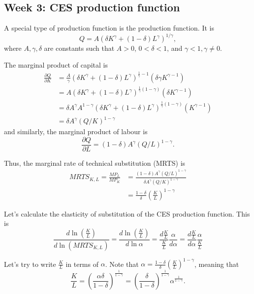 \documentclass[a4paper, 12pt,oneside,openany]{book}
\begin{document}
\subsection{Week 3: CES production function}

A special type of production function is the  production function. It is $$Q = A(\delta K^\gamma + (1-\delta) L^\gamma)^{1/\gamma},$$ where $A, \gamma, \delta$ are constants such that $A>0$, $0<\delta<1$, and $\gamma<1, \gamma \neq 0$.

The marginal product of capital is \begin{align*}\frac{\partial Q}{\partial K} &= \frac{A}{\gamma} (\delta K^\gamma + (1-\delta) L^\gamma)^{\frac{1}{\gamma}-1} (\delta\gamma K^{\gamma-1})\\ &= A(\delta K^\gamma + (1-\delta) L^\gamma)^{\frac{1}{\gamma}(1-\gamma)}(\delta K^{\gamma-1})\\ &= \delta A^\gamma A^{1-\gamma} (\delta K^\gamma+(1-\delta) L^\gamma)^{\frac{1}{\gamma}(1-\gamma)}(K^{\gamma-1})\\ &= \delta A^\gamma (Q/K)^{1-\gamma} \end{align*}  and similarly, the marginal product of labour is $$\frac{\partial Q}{\partial L} = (1-\delta) A^\gamma (Q/L)^{1-\gamma}.$$

Thus, the marginal rate of technical substitution (MRTS) is \begin{align*} MRTS_{K, L} = \frac{MP_L}{MP_K} &= \frac{(1-\delta) A^\gamma (Q/L)^{1-\gamma}}{\delta A^\gamma (Q/K)^{1-\gamma}} \\ &= \frac{1-\delta}{\delta} \left(\frac{K}{L}\right)^{1-\gamma}\end{align*}


Let's calculate the elasticity of substitution of the CES production function. This is $$\frac{d \ln(\frac{K}{L})}{d \ln (MRTS_{K, L})} =\frac{d \ln(\frac{K}{L})}{d \ln \alpha}= \frac{d\frac{K}{L}}{\frac{K}{L}}\frac{\alpha}{d\alpha} = \frac{d\frac{K}{L}}{d\alpha}\frac{\alpha}{\frac{K}{L}}$$

Let's try to write $\frac{K}{L}$ in terms of $\alpha$. Note that $\alpha = \frac{1-\delta}{\delta} \left(\frac{K}{L}\right)^{1-\gamma}$, meaning that $$\frac{K}{L} = \left( \frac{\alpha\delta}{1-\delta} \right)^{\frac{1}{1-\gamma}}=\left( \frac{\delta}{1-\delta} \right)^{\frac{1}{1-\gamma}}\alpha^{\frac{1}{1-\gamma}}.$$
\end{document}
